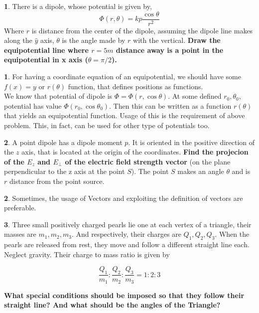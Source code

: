 \documentclass[11pt,a4paper,twocolumn,openright]{article}
\theoremstyle{definition}
\theoremstyle{definition}
\newtheorem{pr}{ \framebox[0.05\textwidth]{{\sffamily Pr}} }
\theoremstyle{definition}
\newtheorem{idea}{ \framebox[0.05\textwidth]{{\sffamily Idea}} }
\theoremstyle{definition}
\begin{document}
\begin{pr}
There is a dipole, whose potential is given by,
\[ \Phi(r,\theta) = kp \frac{\cos\theta}{r^2} \]
Where  $r$ is distance from the center of the dipole, assuming the dipole line makes along the $\hat{y}$ axis, $\theta$ is the angle made by $r$ with the vertical. \textbf{Draw the equipotential line where $r=5m$ distance away is a point in the equipotential in x axis ($\theta = \pi/2$).}

\begin{idea}
For having a coordinate equation of an equipotential, we should have some $f(x)=y$ or $r(\theta)$ function, that defines positions as functions.\\
We know that potential of dipole is $\Phi = \Phi(r,\cos\theta)$. At some defined $r_0,\theta_0$, potential has value $\Phi(r_0, \cos\theta_0)$. Then this can be written as a function $r(\theta)$ that yields an equipotential function. Usage of this is the requirement of above problem. This, in fact, can be used for other type of potentials too.
\end{idea}
\end{pr}
%
\begin{pr}
A point dipole has a dipole moment $p$. It is oriented in the positive direction of the $z$ axis, that is located at the origin of the coordinates. \textbf{Find the projecion of the $E_z$ and $E_{\perp}$ of the electric field strength vector} (on the plane perpendicular to the z axis at the point $S$). The point $S$ makes an angle $\theta$ and is $r$ distance from the point source.
\end{pr}
%
%
\begin{idea}
Sometimes, the usage of Vectors and exploiting the definition of vectors are preferable.
\end{idea}

\begin{pr}
Three small positively charged pearls lie one at each vertex of a triangle, their masses are $m_1,m_2,m_3$. And respectively, their charges are $Q_1, Q_2, Q_3$. When the pearls are released from rest, they move and follow a different straight line each. Neglect gravity. Their charge to mass ratio is given by 

\[ \frac{Q_1}{m_1} : \frac{Q_2}{m_2} : \frac{Q_3}{m_3} = 1:2:3 \]

\textbf{What special conditions should be imposed so that they follow their straight line? And what should be the angles of the Triangle?}
\end{pr}
\end{document}
